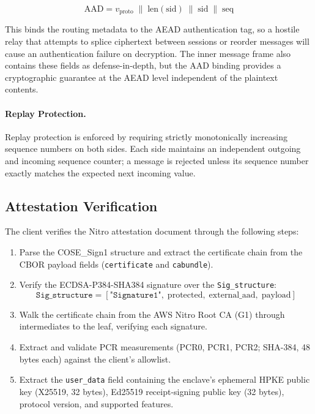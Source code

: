 \documentclass[11pt,a4paper]{article}
\begin{document}
\begin{equation}
\label{eq:aad}
\mathrm{AAD} = v_{\mathrm{proto}} \;\|\;
  \mathrm{len}(\mathrm{sid}) \;\|\;
  \mathrm{sid} \;\|\;
  \mathrm{seq}
\end{equation}

This binds the routing metadata to the AEAD authentication tag, so a hostile relay that attempts to splice ciphertext between sessions or reorder messages will cause an authentication failure on decryption.
The inner message frame also contains these fields as defense-in-depth, but the AAD binding provides a cryptographic guarantee at the AEAD level independent of the plaintext contents.

\paragraph{Replay Protection.}
Replay protection is enforced by requiring strictly monotonically increasing sequence numbers on both sides.
Each side maintains an independent outgoing and incoming sequence counter; a message is rejected unless its sequence number exactly matches the expected next incoming value.

\subsection{Attestation Verification}

The client verifies the Nitro attestation document through the following steps:

\begin{enumerate}
  \item Parse the COSE\_Sign1 structure and extract the certificate chain from the CBOR payload fields (\texttt{certificate} and \texttt{cabundle}).
  \item Verify the ECDSA-P384-SHA384 signature over the \texttt{Sig\_structure}:
  \[
    \texttt{Sig\_structure} = [\texttt{"Signature1"},\; \mathrm{protected},\; \mathrm{external\_aad},\; \mathrm{payload}]
  \]
  \item Walk the certificate chain from the AWS Nitro Root CA (G1) through intermediates to the leaf, verifying each signature.
  \item Extract and validate PCR measurements (PCR0, PCR1, PCR2; SHA-384, 48 bytes each) against the client's allowlist.
  \item Extract the \texttt{user\_data} field containing the enclave's ephemeral HPKE public key (X25519, 32 bytes), Ed25519 receipt-signing public key (32 bytes), protocol version, and supported features.
\end{enumerate}
\end{document}
